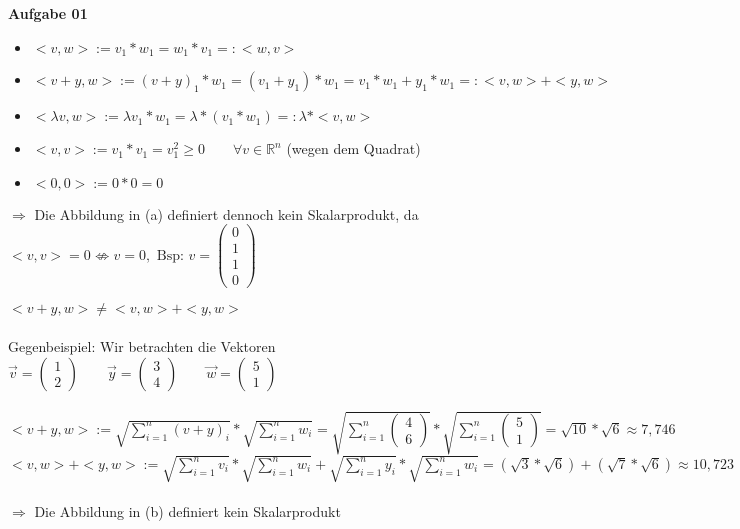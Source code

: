 \documentclass[a4paper,10pt]{article}
\begin{document}
	\parindent0pt
	\textbf{Aufgabe 01}\\
	
	\begin{compactenum} [(a)]
		\item \begin{itemize}
			\item $ <v,w> := v_1 * w_1 = w_1 * v_1 =: <w,v> $
			\item $ <v+y,w> := (v+y)_1 * w_1 = (v_1 + y_1) * w_1 = v_1 * w_1 + y_1* w_1 =: <v,w> + <y,w>$
			\item $ < \lambda v,w> := \lambda v_1 * w_1 = \lambda *(v_1 * w_1) =: \lambda * <v,w> $
			\item $ <v,v> := v_1 * v_1 = v_1^2 \geq 0 \qquad \forall v \in \mathbb{R}^n $ (wegen dem Quadrat)
			\item $ <0,0> := 0*0 = 0 $
		\end{itemize}
		$ \Longrightarrow $ Die Abbildung in (a) definiert dennoch kein Skalarprodukt, da $<v,v> = 0 \nLeftrightarrow v = 0, \text{ Bsp: } v=
		\begin{pmatrix}
			0\\
			1\\
			1\\
			0	
		\end{pmatrix}$\\
	
		\item $<v+y,w> \neq <v,w> + <y,w> $\\\\
		Gegenbeispiel: Wir betrachten die Vektoren\\
		$ \vec{v} = \begin{pmatrix}
		1 \\ 2
		\end{pmatrix} \qquad
		\vec{y} = \begin{pmatrix}
		3 \\ 4
		\end{pmatrix} \qquad
		\vec{w} = \begin{pmatrix}
		5 \\ 1
		\end{pmatrix}$\\
		\\
		$ <v+y,w> := \sqrt{\sum_{i = 1}^{n} (v+y)_i} * \sqrt{\sum_{i = 1}^{n} w_i} = \sqrt{\sum_{i = 1}^{n} \begin{pmatrix}
			4 \\ 6 \end{pmatrix}} * \sqrt{\sum_{i = 1}^{n} \begin{pmatrix}
			5 \\ 1 \end{pmatrix}} = \sqrt{10} * \sqrt{6} \approx 7,746$ \\
		$ <v,w> + <y,w> := \sqrt{\sum_{i = 1}^{n} v_i} * \sqrt{\sum_{i = 1}^{n} w_i} + \sqrt{\sum_{i = 1}^{n} y_i} * \sqrt{\sum_{i = 1}^{n} w_i} = (\sqrt{3} * \sqrt{6}) + (\sqrt{7} * \sqrt{6}) \approx 10,723 $ \\ \\
		$ \Longrightarrow $ Die Abbildung in (b) definiert kein Skalarprodukt \\
		

\end{compactenum}
\end{document}

